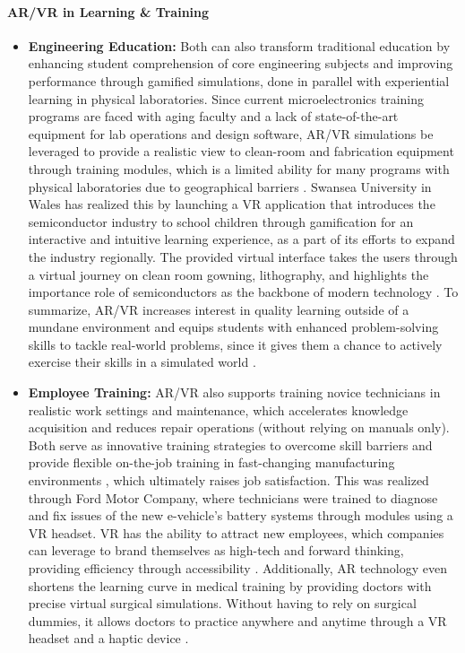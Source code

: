 \paragraph {AR/VR in Learning \& Training}
\begin{itemize}
    \item \textbf{Engineering Education:} Both can also transform traditional education by enhancing student comprehension of core engineering subjects and improving performance through gamified simulations, done in parallel with experiential learning in physical laboratories.  Since current microelectronics training programs are faced with aging faculty and a lack of state-of-the-art equipment for lab operations and design software, AR/VR simulations be leveraged to provide a realistic view to clean-room and fabrication equipment through training modules, which is a limited ability for many programs with physical laboratories due to geographical barriers \cite{fueling_american}. Swansea University in Wales has realized this by launching a VR application that introduces the semiconductor industry to school children through gamification for an interactive and intuitive learning experience, as a part of its efforts to expand the industry regionally. The provided virtual interface takes the users through a virtual journey on clean room gowning, lithography, and highlights the importance role of semiconductors as the backbone of modern technology \cite{Thomas2023-ba}. To summarize, AR/VR increases interest in quality learning outside of a mundane environment and equips students with enhanced problem-solving skills to tackle real-world problems, since it gives them a chance to actively exercise their skills in a simulated world \cite{Makarova2015-dk}.
    
    \item \textbf{Employee Training:} AR/VR also supports training novice technicians in realistic work settings and maintenance, which accelerates knowledge acquisition and reduces repair operations (without relying on manuals only). Both serve as innovative training strategies to overcome skill barriers and provide flexible on-the-job training in fast-changing manufacturing environments \cite{Ulmer2020-xk}, which ultimately raises job satisfaction. This was realized through Ford Motor Company, where technicians were trained to diagnose and fix issues of the new e-vehicle's battery systems through modules using a VR headset. VR has the ability to attract new employees, which companies can leverage to brand themselves as high-tech and forward thinking, providing efficiency through accessibility \cite{Dearborn2020-mc}. Additionally, AR technology even shortens the learning curve in medical training by providing doctors with precise virtual surgical simulations. Without having to rely on surgical dummies, it allows doctors to practice anywhere and anytime through a VR headset and a haptic device \cite{Mileva2019-mz}. 
\end{itemize}

